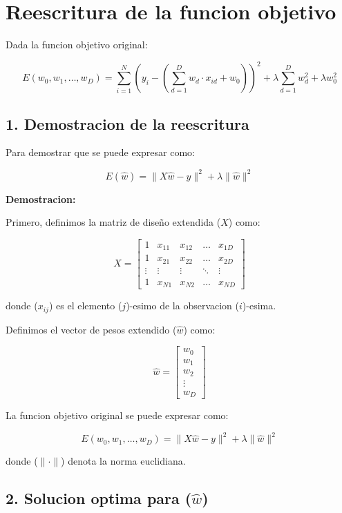 \documentclass{article}
\begin{document}
\section*{Reescritura de la funcion objetivo}

Dada la funcion objetivo original:

\[ E(w_0, w_1, \ldots, w_D) = \sum_{i=1}^N \left( y_i - \left(\sum_{d=1}^D w_d \cdot x_{id} + w_0\right)\right)^2 + \lambda \sum_{d=1}^D w_d^2 + \lambda w_0^2 \]

\subsection*{1. Demostracion de la reescritura}

Para demostrar que se puede expresar como:

\[ E(\hat{w}) = \|X\hat{w} - y\|^2 + \lambda \|\hat{w}\|^2 \]

\textbf{Demostracion:}

Primero, definimos la matriz de diseño extendida (\(X\)) como:

\[ X = \begin{bmatrix}
    1 & x_{11} & x_{12} & \ldots & x_{1D} \\
    1 & x_{21} & x_{22} & \ldots & x_{2D} \\
    \vdots & \vdots & \vdots & \ddots & \vdots \\
    1 & x_{N1} & x_{N2} & \ldots & x_{ND}
\end{bmatrix} \]

donde (\(x_{ij}\)) es el elemento (\(j\))-esimo de la observacion (\(i\))-esima.

Definimos el vector de pesos extendido (\(\hat{w}\)) como:

\[ \hat{w} = \begin{bmatrix}
    w_0 \\
    w_1 \\
    w_2 \\
    \vdots \\
    w_D
\end{bmatrix} \]

La funcion objetivo original se puede expresar como:

\[ E(w_0, w_1, \ldots, w_D) = \|X\hat{w} - y\|^2 + \lambda \|\hat{w}\|^2 \]

donde (\(\| \cdot \|\)) denota la norma euclidiana.

\subsection*{2. Solucion optima para (\(\hat{w}\))}
\end{document}
